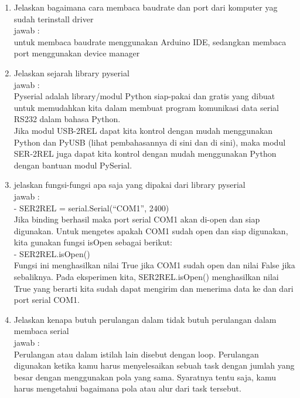 \begin{enumerate}
\item Jelaskan bagaimana cara membaca baudrate dan port dari komputer yag sudah terinstall driver\\
jawab : \\
untuk membaca baudrate menggunakan Arduino IDE, sedangkan membaca port menggunakan device manager\\

\item Jelaskan sejarah library pyserial\\
jawab :\\
Pyserial adalah library/modul Python siap-pakai dan gratis yang dibuat untuk memudahkan kita dalam membuat program komunikasi data serial RS232 dalam bahasa Python.\\

Jika modul USB-2REL dapat kita kontrol dengan mudah menggunakan Python dan PyUSB (lihat pembahasannya di sini dan di sini), maka modul SER-2REL juga dapat kita kontrol dengan mudah menggunakan Python dengan bantuan modul PySerial.\\

\item jelaskan fungsi-fungsi apa saja yang dipakai dari library pyserial\\
jawab :\\
- SER2REL = serial.Serial(“COM1”, 2400)\\

Jika binding berhasil maka port serial COM1 akan di-open dan siap digunakan. Untuk mengetes apakah COM1 sudah open dan siap digunakan, kita gunakan fungsi isOpen sebagai berikut:\\

- SER2REL.isOpen()\\

Fungsi ini menghasilkan nilai True jika COM1 sudah open dan nilai False jika sebaliknya. Pada eksperimen kita, SER2REL.isOpen() menghasilkan nilai True yang berarti kita sudah dapat mengirim dan menerima data ke dan dari port serial COM1.\\

\item Jelaskan kenapa butuh perulangan dalam tidak butuh perulangan dalam membaca serial\\
jawab :\\
Perulangan atau dalam istilah lain disebut dengan loop. Perulangan digunakan ketika kamu harus menyelesaikan sebuah task dengan jumlah yang besar dengan menggunakan pola yang sama. Syaratnya tentu saja, kamu harus mengetahui bagaimana pola atau alur dari task tersebut. \\


\end{enumerate}
